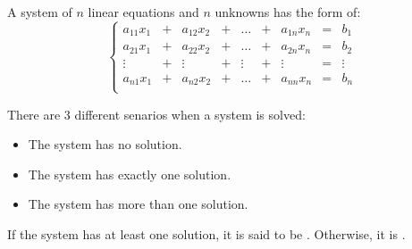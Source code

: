     \par A system of $n$ linear equations and $n$ unknowns has the form of:
    \[
      \left\{
        \begin{aligned}
          a_{11} x_{1} &+& a_{12} x_{2} &+& \ldots &+& a_{1n} x_{n} &=& b_{1}  \\
          a_{21} x_{1} &+& a_{22} x_{2} &+& \ldots &+& a_{2n} x_{n} &=& b_{2}  \\
          \vdots       &+& \vdots       &+& \vdots &+& \vdots       &=& \vdots \\
          a_{n1} x_{1} &+& a_{n2} x_{2} &+& \ldots &+& a_{nn} x_{n} &=& b_{n}  \\
        \end{aligned}
      \right.
    \]
    \par There are 3 different senarios when a system is solved:
      \begin{itemize}
        \item The system has no solution.
        \item The system has exactly one solution.
        \item The system has more than one solution.
      \end{itemize}
    \par If the system has at least one solution, it is said to be .
    Otherwise, it is .

